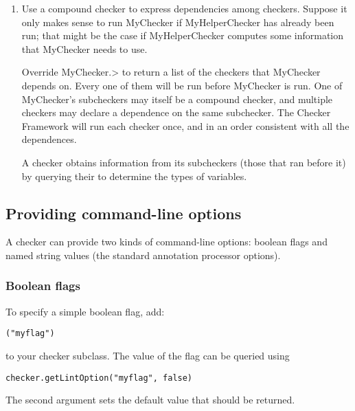 \begin{enumerate}
\item
Use a compound checker to express dependencies among checkers.  Suppose it
only makes sense to run MyChecker if MyHelperChecker has already been run;
that might be the case if MyHelperChecker computes some information that
MyChecker needs to use.

Override
\<MyChecker.>
to return a list of the checkers that MyChecker depends on.  Every one of
them will be run before MyChecker is run.  One of MyChecker's subcheckers
may itself be a compound checker, and multiple checkers may declare a
dependence on the same subchecker.  The Checker Framework will run each
checker once, and in an order consistent with all the dependences.

A checker obtains information from its subcheckers (those that ran before
it) by querying their  to
determine the types of variables.

\end{enumerate}



\subsection{Providing command-line options\label{providing-command-line-options}}

A checker can provide two kinds of command-line options:
boolean flags and
named string values (the standard annotation processor
options).

\subsubsection{Boolean flags\label{providing-command-line-options-boolean-flags}}

To specify a simple boolean flag, add:

\begin{alltt}
({"myflag"})
\end{alltt}

to your checker subclass.
The value of the flag can be queried using

\begin{Verbatim}
checker.getLintOption("myflag", false)
\end{Verbatim}

The second argument sets the default value that should be returned.

